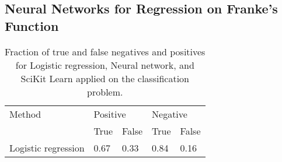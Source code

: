 \subsection{Neural Networks for Regression on Franke's Function}


\begin{table}[htbp]
\renewcommand{\arraystretch}{1.2}
\caption{Fraction of true and false negatives and positives for Logistic regression, Neural network, and SciKit Learn applied on the classification problem.}
	\begin{tabular}{p{20mm} l l l l}
		\toprule
		Method & \multicolumn{2}{l}{Positive} & \multicolumn{2}{l}{Negative} \\
		\cline{2-3} \cline{4-5}
		& True & False & True & False \\
		\midrule
		Logistic \newline regression & 0.67 & 0.33 & 0.84 & 0.16 \\
		\bottomrule
	\end{tabular}
\label{tab:confusion}
\end{table}

\begin{table}

\end{table}


\begin{figure}[htbp]
	\centering
	\caption{}
	\label{fig:}
\end{figure}
